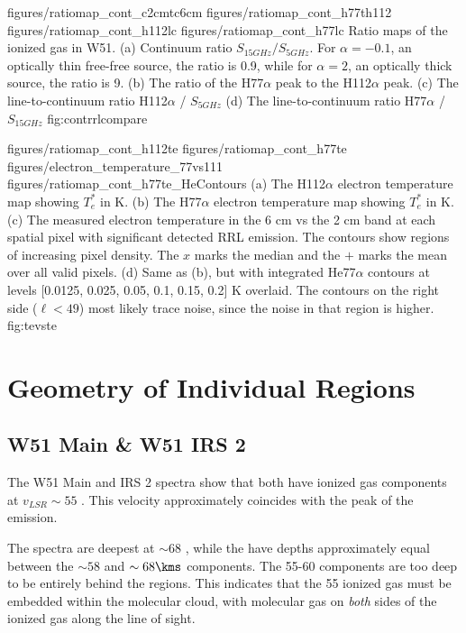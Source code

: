 \FigureFourPDF
{figures/ratiomap_cont_c2cmtc6cm}
{figures/ratiomap_cont_h77th112}
{figures/ratiomap_cont_h112lc}
{figures/ratiomap_cont_h77lc}
{Ratio maps of the ionized gas in W51.  
(a) Continuum ratio $S_{15 GHz} / S_{5 GHz}$.  For $\alpha=-0.1$, an optically
thin free-free source, the ratio is 0.9, while for $\alpha=2$, an optically thick source,
the ratio is 9.
(b) The ratio of the H77$\alpha$ peak to the H112$\alpha$ peak.
(c) The line-to-continuum ratio H112$\alpha$ / $S_{5 GHz}$
(d) The line-to-continuum ratio H77$\alpha$ / $S_{15 GHz}$
}
{fig:contrrlcompare}

\FigureFourPDF
{figures/ratiomap_cont_h112te}
{figures/ratiomap_cont_h77te}
{figures/electron_temperature_77vs111}
{figures/ratiomap_cont_h77te_HeContours}
{(a) The H112$\alpha$ electron temperature map showing $T_e^*$ in K. 
(b) The H77$\alpha$ electron temperature map showing $T_e^*$ in K.
(c) The measured electron temperature in the 6 cm vs the 2 cm band at each spatial
pixel with significant detected RRL emission.  The contours show regions of
increasing pixel density.  The $x$ marks the median and the $+$ marks the mean
over all valid pixels.
(d) Same as (b), but with integrated He77$\alpha$ contours at levels [0.0125,
0.025, 0.05, 0.1, 0.15, 0.2] K \kms overlaid.  The contours on the right side
($\ell<49$) most likely trace noise, since the noise in that region is higher.
}
{fig:tevste}%

\section{Geometry of Individual Regions}
\label{appendix:geometry}
\subsection{W51 Main \& W51 IRS 2}
The W51 Main and IRS 2 spectra show that both have ionized gas components at
$v_{LSR}\sim 55$ \kms.  This velocity approximately coincides with the peak of
the \thirteenco emission.

The \formaldehyde \oneone spectra are deepest at $\sim68$ \kms, while the
\twotwo have depths approximately equal between the $\sim58$ \kms and $\sim 68
\kms$ components.  The 55-60 \kms components are too deep to be entirely behind
the \hii regions.  This indicates that the 55 \kms ionized gas must be embedded
within the molecular cloud, with molecular gas on \emph{both} sides of the
ionized gas along the line of sight.


